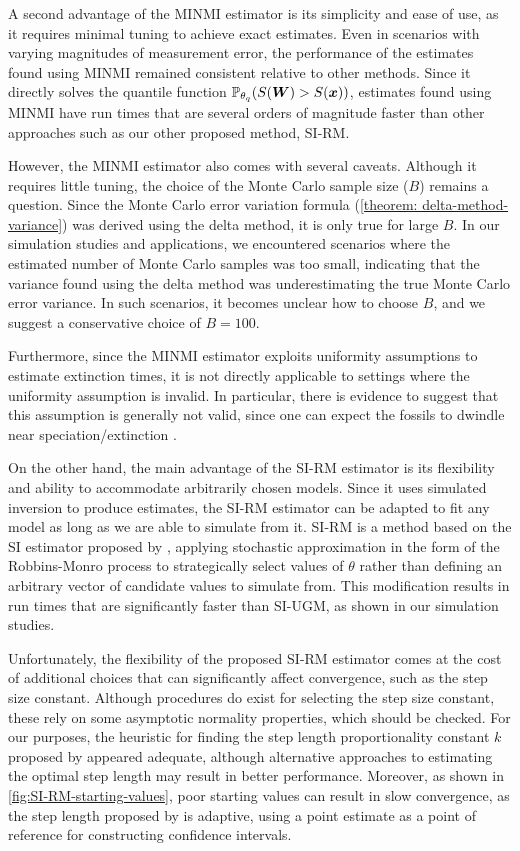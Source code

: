 A second advantage of the MINMI estimator is its simplicity and ease of use, as it requires minimal tuning to achieve exact estimates. Even in scenarios with varying magnitudes of measurement error, the performance of the estimates found using MINMI remained consistent relative to other methods. Since it directly solves the quantile function $\mathbb{P}_{\theta_q}(S(\bm{W}) > S(\bm{x}))$, estimates found using MINMI have run times that are several orders of magnitude faster than other approaches such as our other proposed method, SI-RM.

However, the MINMI estimator also comes with several caveats. Although it requires little tuning, the choice of the Monte Carlo sample size ($B$) remains a question. Since the Monte Carlo error variation formula (\autoref{theorem: delta-method-variance}) was derived using the delta method, it is only true for large $B$. In our simulation studies and applications, we encountered scenarios where the estimated number of Monte Carlo samples was too small, indicating that the variance found using the delta method was underestimating the true Monte Carlo error variance. In such scenarios, it becomes unclear how to choose $B$, and we suggest a conservative choice of $B = 100$.

Furthermore, since the MINMI estimator exploits uniformity assumptions to estimate extinction times, it is not directly applicable to settings where the uniformity assumption is invalid. In particular, there is evidence to suggest that this assumption is generally not valid, since one can expect the fossils to dwindle near speciation/extinction \cite{Lee2010, Signor1982, WangMarshall2016}.

On the other hand, the main advantage of the SI-RM estimator is its flexibility and ability to accommodate arbitrarily chosen models. Since it uses simulated inversion to produce estimates, the SI-RM estimator can be adapted to fit any model as long as we are able to simulate from it. SI-RM is a method based on the SI estimator proposed by \citet{Huang2019}, applying stochastic approximation in the form of the Robbins-Monro process to strategically select values of $\theta$ rather than defining an arbitrary vector of candidate values to simulate from. This modification results in run times that are significantly faster than SI-UGM, as shown in our simulation studies.

Unfortunately, the flexibility of the proposed SI-RM estimator comes at the cost of additional choices that can significantly affect convergence, such as the step size constant. Although procedures do exist for selecting the step size constant, these rely on some asymptotic normality properties, which should be checked. For our purposes, the heuristic for finding the step length proportionality constant $k$ proposed by \citet{Garthwaite1992} appeared adequate, although alternative approaches to estimating the optimal step length may result in better performance. Moreover, as shown in \autoref{fig:SI-RM-starting-values}, poor starting values can result in slow convergence, as the step length proposed by \citet{Garthwaite1992} is adaptive, using a point estimate as a point of reference for constructing confidence intervals. 

